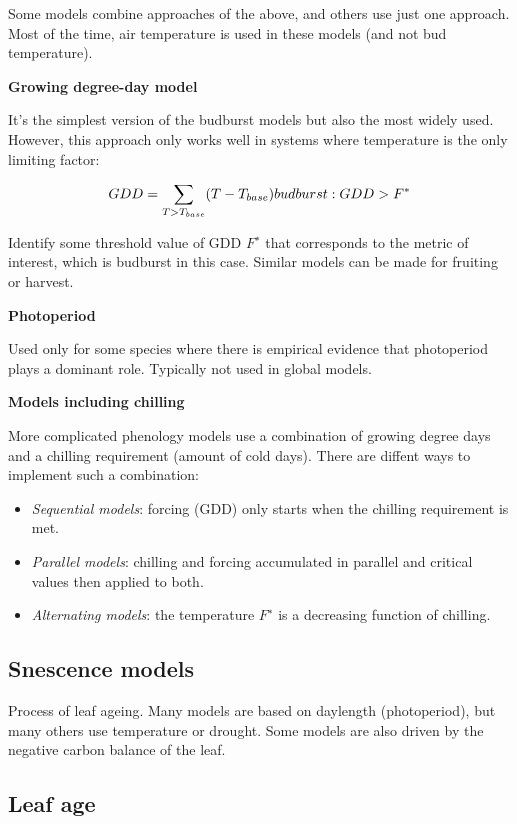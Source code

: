 \documentclass[
  12pt,
  oneside]{book}
\begin{document}
Some models combine approaches of the above, and others use just one approach. Most of the time, air temperature is used in these models (and not bud temperature).

\textbf{Growing degree-day model}

It's the simplest version of the budburst models but also the most widely used. However, this approach only works well in systems where temperature is the only limiting factor:

\[
GDD = \sum_{T>T_{base}}(T-T_{base}) \\
budburst:GDD>F^*
\]

Identify some threshold value of GDD \(F^∗\) that corresponds to the metric of interest, which is budburst in this case. Similar models can be made for fruiting or harvest.

\textbf{Photoperiod}

Used only for some species where there is empirical evidence that photoperiod plays a dominant role. Typically not used in global models.

\textbf{Models including chilling}

More complicated phenology models use a combination of growing degree days and a chilling requirement (amount of cold days). There are diffent ways to implement such a combination:

\begin{itemize}
\item
  \emph{Sequential models}: forcing (GDD) only starts when the chilling requirement is met.
\item
  \emph{Parallel models}: chilling and forcing accumulated in parallel and critical values then applied to both.
\item
  \emph{Alternating models}: the temperature \(F^∗\) is a decreasing function of chilling.
\end{itemize}

\hypertarget{snescence-models}{%
\subsection{Snescence models}\label{snescence-models}}

Process of leaf ageing. Many models are based on daylength (photoperiod), but many others use temperature or drought. Some models are also driven by the negative carbon balance of the leaf.

\hypertarget{leaf-age}{%
\subsection{Leaf age}\label{leaf-age}}
\end{document}
